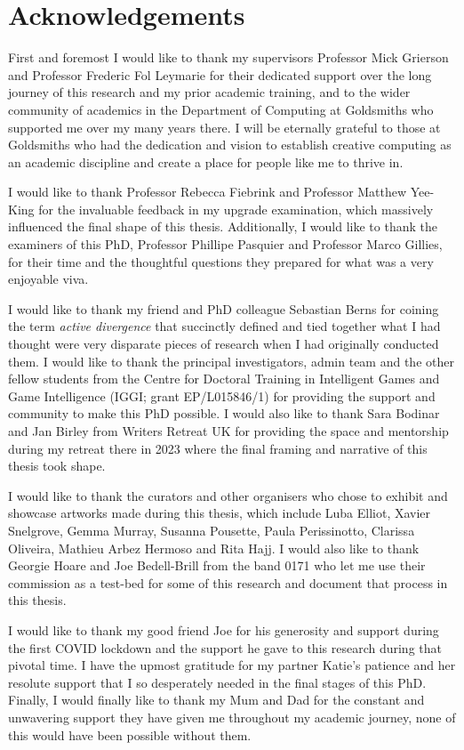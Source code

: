 \chapter*{Acknowledgements}

First and foremost I would like to thank my supervisors Professor Mick Grierson and Professor Frederic Fol Leymarie for their dedicated support over the long journey of this research and my prior academic training, and to the wider community of academics in the Department of Computing at Goldsmiths who supported me over my many years there. I will be eternally grateful to those at Goldsmiths who had the dedication and vision to establish creative computing as an academic discipline and create a place for people like me to thrive in. 

I would like to thank Professor Rebecca Fiebrink and Professor Matthew Yee-King for the invaluable feedback in my upgrade examination, which massively influenced the final shape of this thesis. Additionally, I would like to thank the examiners of this PhD, Professor Phillipe Pasquier and Professor Marco Gillies, for their time and the thoughtful questions they prepared for what was a very enjoyable viva. 

I would like to thank my friend and PhD colleague Sebastian Berns for coining the term \textit{active divergence} that succinctly defined and tied together what I had thought were very disparate pieces of research when I had originally conducted them. I would like to thank the principal investigators, admin team and the other fellow students from the Centre for Doctoral Training in Intelligent Games and Game Intelligence (IGGI; grant EP/L015846/1) for providing the support and community to make this PhD possible. I would also like to thank Sara Bodinar and Jan Birley from Writers Retreat UK for providing the space and mentorship during my retreat there in 2023 where the final framing and narrative of this thesis took shape. 

I would like to thank the curators and other organisers who chose to exhibit and showcase artworks made during this thesis, which include Luba Elliot, Xavier Snelgrove, Gemma Murray, Susanna Pousette, Paula Perissinotto, Clarissa Oliveira, Mathieu Arbez Hermoso and Rita Hajj. I would also like to thank Georgie Hoare and Joe Bedell-Brill from the band 0171 who let me use their commission as a test-bed for some of this research and document that process in this thesis.

I would like to thank my good friend Joe for his generosity and support during the first COVID lockdown and the support he gave to this research during that pivotal time. I have the upmost gratitude for my partner Katie's patience and her resolute support that I so desperately needed in the final stages of this PhD. Finally, I would finally like to thank my Mum and Dad for the constant and unwavering support they have given me throughout my academic journey, none of this would have been possible without them. 

